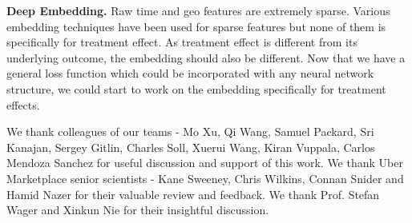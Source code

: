 \textbf{Deep Embedding.} Raw time and geo features are extremely sparse. Various embedding techniques have been used for sparse features but none of them is specifically for treatment effect. As treatment effect is different from its underlying outcome, the embedding should also be different. Now that we have a general loss function which could be incorporated with any neural network structure, we could start to work on the embedding specifically for treatment effects.


\begin{acks}
We thank colleagues of our teams - Mo Xu, Qi Wang, Samuel Packard, Sri Kanajan, Sergey Gitlin, Charles Soll, Xuerui Wang, Kiran Vuppala, Carlos Mendoza Sanchez for useful discussion and support of this work. We thank Uber Marketplace senior scientists - Kane Sweeney, Chris Wilkins, Connan Snider and Hamid Nazer for their valuable review and feedback. We thank Prof. Stefan Wager and Xinkun Nie for their insightful discussion.

\end{acks}
